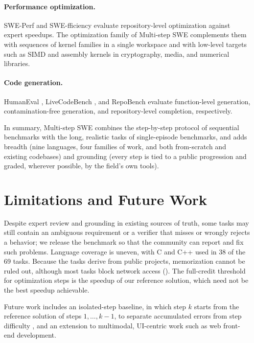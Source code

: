 \documentclass{article}
\newcommand{\bench}{Multi-step SWE\xspace}
\begin{document}
\paragraph{Performance optimization.}
SWE-Perf \citep{he2025sweperf} and SWE-fficiency \citep{ma2025swefficiency}
evaluate repository-level optimization against expert speedups. The
optimization family of \bench complements them with sequences of kernel
families in a single workspace and with low-level targets such as SIMD and
assembly kernels in cryptography, media, and numerical libraries.

\paragraph{Code generation.}
HumanEval \citep{chen2021humaneval}, LiveCodeBench
\citep{jain2024livecodebench}, and RepoBench \citep{liu2023repobench} evaluate
function-level generation, contamination-free generation, and repository-level
completion, respectively.

In summary, \bench combines the step-by-step protocol of sequential benchmarks
with the long, realistic tasks of single-episode benchmarks, and adds breadth
(nine languages, four families of work, and both from-scratch and existing
codebases) and grounding (every step is tied to a public progression and
graded, wherever possible, by the field's own tools).

\section{Limitations and Future Work}
\label{sec:future-work}

Despite expert review and grounding in existing sources of truth, some tasks may
still contain an ambiguous requirement or a verifier that misses or wrongly
rejects a behavior; we release the benchmark so that the community can report
and fix such problems. Language coverage is uneven, with C and C++ used in 38 of
the 69 tasks. Because the tasks derive from public projects, memorization
cannot be ruled out, although most tasks block network access
(). The full-credit threshold for optimization steps is the
speedup of our reference solution, which need not be the best speedup
achievable.

Future work includes an isolated-step baseline, in which step $k$ starts from
the reference solution of steps $1,\dots,k-1$, to separate accumulated errors
from step difficulty
\citep{shen2026evocodebench,deng2026swemilestone,shastry2026swesteps}, and an
extension to multimodal, UI-centric work such as web front-end development.
\end{document}
